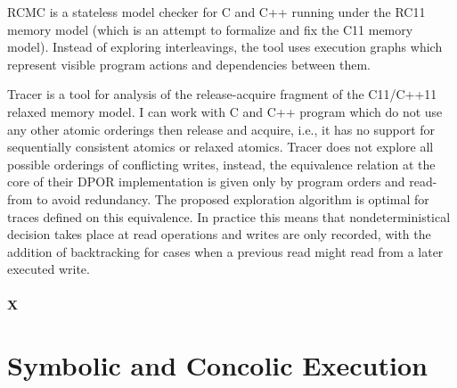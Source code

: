 
RCMC  is a stateless model checker for C and C++ running under the RC11 memory model  (which is an attempt to formalize and fix the C11 memory model).
Instead of exploring interleavings, the tool uses execution graphs which represent visible program actions and dependencies between them.

Tracer  is a tool for analysis of the release-acquire fragment of the C11/C++11 relaxed memory model.
I can work with C and C++ program which do not use any other atomic orderings then release and acquire, i.e., it has no support for sequentially consistent atomics or relaxed atomics.
Tracer does not explore all possible orderings of conflicting writes, instead, the equivalence relation at the core of their DPOR implementation is given only by program orders and read-from to avoid redundancy.
The proposed exploration algorithm is optimal for traces defined on this equivalence.
In practice this means that nondeterministical decision takes place at read operations and writes are only recorded, with the addition of backtracking for cases when a previous read might read from a later executed write.

\paragraph{X}




\section{Symbolic and Concolic Execution}

